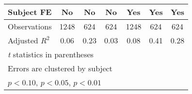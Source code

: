 \begin{table}[htbp]
\begin{tabular}{l*{6}{c}}
Subject FE      &       No         &       No         &       No         &      Yes         &      Yes         &      Yes         \\
\hline
Observations    &     1248         &      624         &      624         &     1248         &      624         &      624         \\
Adjusted \(R^{2}\)&     0.06         &     0.23         &     0.03         &     0.08         &     0.41         &     0.28         \\
\hline\hline
\multicolumn{7}{l}{\footnotesize \textit{t} statistics in parentheses}\\
\multicolumn{7}{l}{\footnotesize Errors are clustered by subject}\\
\multicolumn{7}{l}{\footnotesize \sym{*} \(p<0.10\), \sym{**} \(p<0.05\), \sym{***} \(p<0.01\)}\\
\end{tabular}
\end{table}
